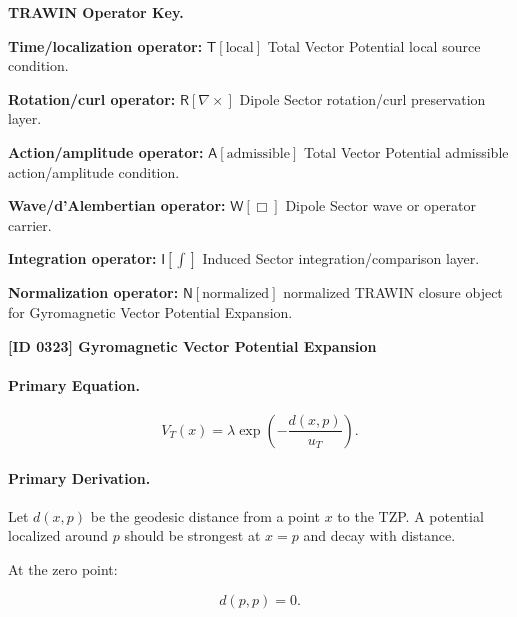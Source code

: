 \par\vspace{0.45\baselineskip}
\noindent\begin{minipage}[t]{\linewidth}
\begingroup
\small
\raggedright
\textbf{TRAWIN Operator Key.}\par
\noindent\textbf{Time/localization operator:} $\mathsf{T}\!\left[\mathrm{local}\right]$ Total Vector Potential local source condition.\par
\noindent\textbf{Rotation/curl operator:} $\mathsf{R}\!\left[\nabla\times\right]$ Dipole Sector rotation/curl preservation layer.\par
\noindent\textbf{Action/amplitude operator:} $\mathsf{A}\!\left[\mathrm{admissible}\right]$ Total Vector Potential admissible action/amplitude condition.\par
\noindent\textbf{Wave/d'Alembertian operator:} $\mathsf{W}\!\left[\Box\right]$ Dipole Sector wave or operator carrier.\par
\noindent\textbf{Integration operator:} $\mathsf{I}\!\left[\int\right]$ Induced Sector integration/comparison layer.\par
\noindent\textbf{Normalization operator:} $\mathsf{N}\!\left[\mathrm{normalized}\right]$ normalized TRAWIN closure object for Gyromagnetic Vector Potential Expansion.\par
\endgroup
\end{minipage}

\clearpage
\noindent\textbf{[ID 0323] Gyromagnetic Vector Potential Expansion}\par
\vspace{0.35em}
\paragraph{Primary Equation.}
\begin{equation}
V_T(x)
=
\lambda
\exp\left(
-\frac{d(x,p)}{u_T}
\right).
\end{equation}

\paragraph{Primary Derivation.}
Let $d(x,p)$ be the geodesic distance from a point $x$ to the TZP.  
A potential localized around $p$ should be strongest at $x=p$ and decay with distance.

At the zero point:

\begin{equation}
d(p,p)=0 .
\end{equation}

